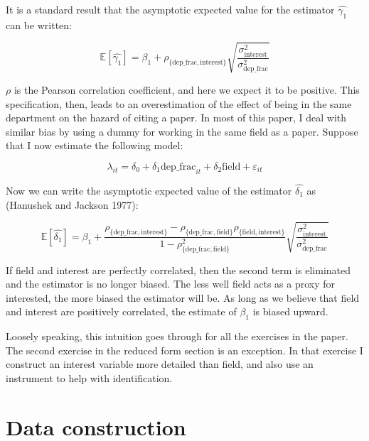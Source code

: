 It is a standard result that the asymptotic expected value for the
estimator $\hat{\gamma_1}$ can be written:

\begin{equation}
    \mathbb{E}[\hat{\gamma_1}] = \beta_1 + \rho_{\{\mbox{dep\_frac},\mbox{interest}\}} \sqrt{\frac{\sigma_{\mbox{interest}}^2}{\sigma_{\mbox{dep\_frac}}^2}}
\end{equation}

$\rho$ is the Pearson correlation coefficient, and here we expect it to
be positive. This specification, then, leads to an overestimation of the
effect of being in the same department on the hazard of citing a paper.
In most of this paper, I deal with similar bias by using a dummy for
working in the same field as a paper. Suppose that I now estimate the
following model:

\begin{equation}
    \lambda_{it} = \delta_0 + \delta_1 \mbox{dep\_frac}_{it} + \delta_2 \mbox{field} + \varepsilon_{it}
\end{equation}

Now we can write the asymptotic expected value of the estimator
$\hat{\delta_1}$ as (Hanushek and Jackson 1977):

\begin{equation}
    \mathbb{E}[\hat{\delta_1}] = \beta_1 + \frac{\rho_{\{\mbox{dep\_frac},\mbox{interest}\}} - \rho_{\{\mbox{dep\_frac},\mbox{field}\}}\rho_{\{\mbox{field},\mbox{interest}\}}}{1 - \rho_{\{\mbox{dep\_frac},\mbox{field}\}}^2} \sqrt{\frac{\sigma_{\mbox{interest}}^2}{\sigma_{\mbox{dep\_frac}}^2}}
\end{equation}

If field and interest are perfectly correlated, then the second term is
eliminated and the estimator is no longer biased. The less well field
acts as a proxy for interested, the more biased the estimator will be.
As long as we believe that field and interest are positively correlated,
the estimate of $\beta_1$ is biased upward.

Loosely speaking, this intuition goes through for all the exercises in
the paper. The second exercise in the reduced form section is an
exception. In that exercise I construct an interest variable more
detailed than field, and also use an instrument to help with
identification.

\clearpage
\section{Data construction}
\label{sec:dat_cons}

